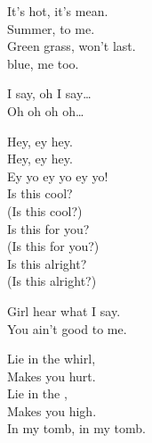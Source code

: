 


It's hot, it's mean. \\
Summer, to me. \\
Green grass, won't last. \\
 blue, me too. \\




I say, oh I say… \\

Oh oh oh oh… \\




Hey, ey hey. \\
Hey, ey hey. \\
Ey yo ey yo ey yo! \\

Is this cool? \\
(Is this cool?) \\
Is this for you? \\
(Is this for you?) \\
Is this alright? \\
(Is this alright?) \\




Girl hear what I say. \\
You ain't good to me. \\




Lie in the whirl, \\
Makes you hurt. \\
Lie in the , \\
Makes you high. \\
In my tomb, in my tomb. \\


